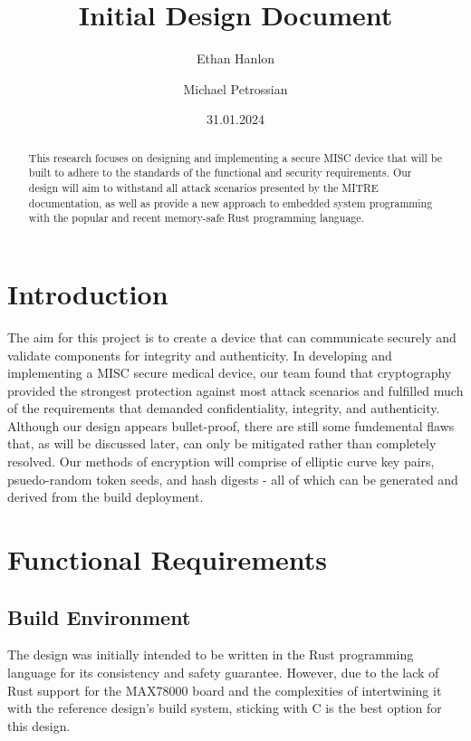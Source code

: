 \documentclass{prace}
\title{Initial Design Document}
\date{31.01.2024}
\author[1]{Ethan Hanlon}
\author[1]{Michael Petrossian}
\affiliation{San Francisco State University, 1600 Holloway Avenue, San Francisco, CA 94132, USA}
\begin{document}
\maketitle
\begin{abstract}
This research focuses on designing and implementing a secure MISC device that will be built to adhere to the standards of the functional and security requirements. Our design will 
aim to withstand all attack scenarios presented by the MITRE documentation, as well as provide a new approach to embedded system programming with the popular and recent memory-safe Rust programming language. 
\end{abstract}

\section{Introduction}

The aim for this project is to create a device that can communicate securely and validate components for integrity and authenticity.
In developing and implementing a MISC secure medical device, our team found that cryptography
provided the strongest protection against most attack scenarios and fulfilled much of the requirements
that demanded confidentiality, integrity, and authenticity. Although our design appears bullet-proof, there are still
some fundemental flaws that, as will be discussed later, can only be mitigated rather than completely resolved. Our methods of encryption will comprise of elliptic curve key pairs, 
psuedo-random token seeds, and hash digests - all of which can be generated and derived from the build deployment.

\section{Functional Requirements}

\subsection{Build Environment}

The design was initially intended to be written in the Rust programming language for its consistency and safety guarantee. However,
due to the lack of Rust support for the MAX78000 board and the complexities of intertwining it with the reference design's build system, sticking with C 
is the best option for this design.
\end{document}
